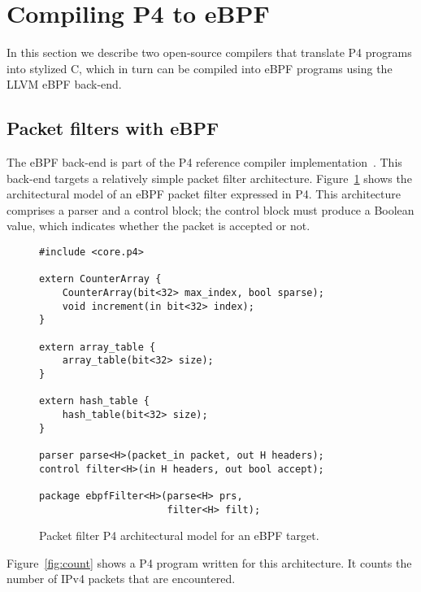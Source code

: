 \section{Compiling P4 to eBPF}\label{sec:compilation}

In this section we describe two open-source compilers that translate
P4 programs into stylized C, which in turn can be compiled into
eBPF programs using the LLVM eBPF back-end.


\subsection{Packet filters with eBPF}\label{sec:ebpf}

The eBPF back-end is part of the P4 reference compiler
implementation~\cite{p4-ebpf-backend}.  This back-end targets a
relatively simple packet filter architecture.
Figure~\ref{fig:ebpf-model} shows the architectural model of an eBPF
packet filter expressed in P4.  This architecture comprises a parser
and a control block; the control block must produce a Boolean value,
which indicates whether the packet is accepted or not.

\begin{figure}[h]
\begin{lstlisting}
#include <core.p4>

extern CounterArray {
    CounterArray(bit<32> max_index, bool sparse);
    void increment(in bit<32> index);
}

extern array_table {
    array_table(bit<32> size);
}

extern hash_table {
    hash_table(bit<32> size);
}

parser parse<H>(packet_in packet, out H headers);
control filter<H>(in H headers, out bool accept);

package ebpfFilter<H>(parse<H> prs,
                      filter<H> filt);
\end{lstlisting}
\caption{Packet filter P4 architectural model for an eBPF
  target.}\label{fig:ebpf-model}
\end{figure}

Figure~\ref{fig:count} shows a P4 program written for this
architecture. It counts the number of IPv4 packets that are
encountered.

